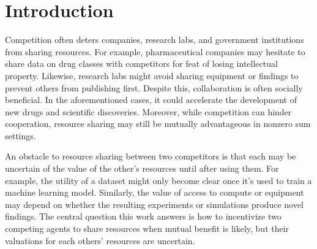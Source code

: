\section{Introduction}


Competition often deters companies, research labs, and government institutions from sharing resources. 
For example, pharmaceutical companies may hesitate to share data on drug classes with competitors 
for feat of losing intellectual property. Likewise, research labs might avoid sharing equipment or findings to prevent 
others from publishing first. Despite this, collaboration is often socially beneficial. In the aforementioned cases, 
it could accelerate the development of new drugs and scientific discoveries. 
Moreover, while competition can hinder cooperation, resource sharing may still be mutually advantageous 
in nonzero sum settings. 

An obstacle to resource sharing between two competitors is that each may be uncertain of the value of the 
other's resources until after using them. For example, the utility of a dataset might only become 
clear once it's used to train a machine learning model. Similarly, the value of access to compute or equipment 
may depend on whether the resulting experiments or simulations produce novel findings. 
The central question this work answers is how to incentivize
two competing agents to share resources when mutual benefit is likely, but their valuations for each 
others' resources are uncertain.

